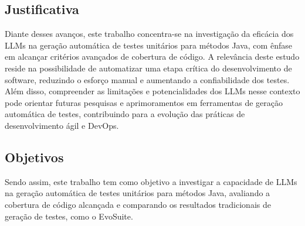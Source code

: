 \subsection{Justificativa}
Diante desses avanços, este trabalho concentra-se na investigação da eficácia dos LLMs na geração automática de testes unitários para métodos Java, com ênfase em alcançar critérios avançados de cobertura de código. A relevância deste estudo reside na possibilidade de automatizar uma etapa crítica do desenvolvimento de software, reduzindo o esforço manual e aumentando a confiabilidade dos testes. Além disso, compreender as limitações e potencialidades dos LLMs nesse contexto pode orientar futuras pesquisas e aprimoramentos em ferramentas de geração automática de testes, contribuindo para a evolução das práticas de desenvolvimento ágil e DevOps.

\subsection{Objetivos}
Sendo assim, este trabalho tem como objetivo a investigar a capacidade de LLMs na geração automática de testes unitários para métodos Java, avaliando a cobertura de código alcançada e comparando os resultados tradicionais de geração de testes, como o EvoSuite.